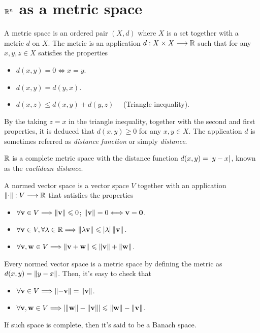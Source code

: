 \section{$\Rtn$ as a metric space}
\begin{defn}
A metric space is an ordered pair $\left(X, d\right)$ where $X$ is a set together with a metric $d$ on $X$. The metric is an 
application $\appl{d}{X\times X}{\R}$ such that for any $x, y, z\in X$ satisfies the properties
\begin{itemize}[itemsep = -2pt]
	\item $d(x, y) = 0\iff x = y$.
	\item $d(x, y) = d(y, x)$.
	\item $d(x, z) \leq d(x, y) + d(y, z)\quad$ (Triangle inequality).
\end{itemize}
By the taking $z = x$ in the triangle inequality, together with the second and first properties, it is deduced that $d(x, y)\geq 0$
	for any $x, y\in X$. The application $d$ is sometimes referred as \textit{distance function} or simply \textit{distance}.
\end{defn}

\begin{example}
	$\R$ is a complete metric space with the distance function $d(x, y) = \abs{y - x}$, known as the \textit{euclidean distance}.
\end{example}

\begin{defn}
A normed vector space is a vector space $V$ together with an application $\appl{\vnorm{\cdot}}{V}{\R}$ that satisfies the 
properties
\begin{itemize}[itemsep = -2pt]
\item $\forall\mathbf{v}\in V\Longrightarrow \left\Vert \mathbf{v} \right\Vert \leqslant 0$; $\left\Vert \mathbf{v} \right\Vert = 0\Longleftrightarrow \mathbf{v} = \mathbf{0}$.
\item $\forall\vec{v}\in V, \forall\lambda\in\R\implies \vnorm{\lambda\vec{v}}\leq\abs{\lambda}\vnorm{\vec{v}}$.
\item $\forall\mathbf{v}, \mathbf{w}\in V \Longrightarrow \left\Vert \mathbf{v} + \mathbf{w} \right\Vert \leqslant \left\Vert \mathbf{v} \right\Vert + \left\Vert \mathbf{w} \right\Vert$.
\end{itemize}
\end{defn}

\begin{prop}
Every normed vector space is a metric space by defining the metric as $d(x, y) = \left\Vert y - x \right\Vert$. Then, it's easy to check that
\begin{itemize}[itemsep = -2pt]
\item $\forall\mathbf{v}\in V\Longrightarrow \left\Vert -\mathbf{v} \right\Vert = \left\Vert \mathbf{v} \right\Vert$.
\item $\forall\mathbf{v}, \mathbf{w}\in V\Longrightarrow \abs{\left\Vert \mathbf{w} \right\Vert - \left\Vert \mathbf{v} \right\Vert} \leqslant \left\Vert \mathbf{w} \right\Vert - \left\Vert \mathbf{v} \right\Vert$.
\end{itemize}
If such space is complete, then it's said to be a Banach space.
\end{prop}

